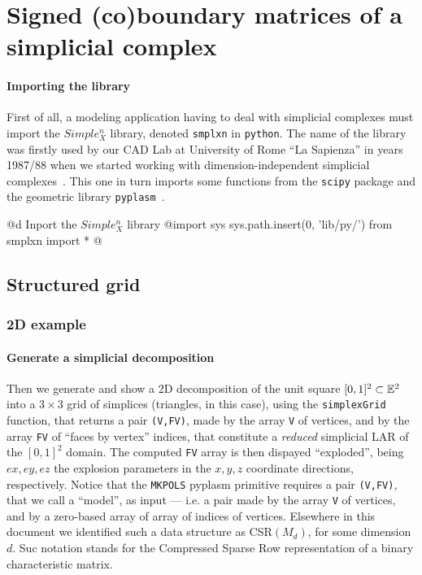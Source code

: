 \documentclass[11pt,oneside]{article}	%
\begin{document}
\section{Signed (co)boundary matrices of a simplicial complex}
\label{simplicial}

\paragraph{Importing the library}
First of all, a modeling application having to deal with simplicial complexes must import the $Simple_X^n$ library, denoted \texttt{smplxn} in \texttt{python}. The name of the library was firstly used by our CAD Lab at University of Rome ``La Sapienza'' in years 1987/88 when we started working with dimension-independent simplicial complexes~\cite{Paoluzzi:1993:DMS:169728.169719}. This one in turn imports some functions from the \texttt{scipy} package and the geometric library \texttt{pyplasm}~\cite{}.

@d Inport the $Simple_X^n$ library
@{import sys
sys.path.insert(0, 'lib/py/')
from smplxn import *
@}

\subsection{Structured grid}

\subsubsection{2D example}

\paragraph{Generate a simplicial decomposition}
Then we generate and show a 2D decomposition of the unit square $[0,1]^2\subset\mathbb{E}^2$ into a $3\times 3$ grid of simplices (triangles, in this case), using the \texttt{simplexGrid} function, that returns a pair \texttt{(V,FV)}, made by the array \texttt{V} of vertices, and by the array \texttt{FV} of ``faces by vertex'' indices, that constitute a \emph{reduced} simplicial LAR of the $[0,1]^2$ domain. The computed \texttt{FV} array is then dispayed ``exploded'', being $ex,ey,ez$ the explosion parameters in the $x,y,z$ coordinate directions, respectively. Notice that the \texttt{MKPOLS} pyplasm primitive requires a pair \texttt{(V,FV)}, that we call a ``model'', as input --- i.e. a pair made by the array \texttt{V} of vertices, and by a zero-based array of array of indices of vertices. Elsewhere in this document we identified such a data structure as CSR$(M_d)$, for some dimension $d$. Suc notation stands for the Compressed Sparse Row representation of a binary characteristic matrix.
\end{document}
